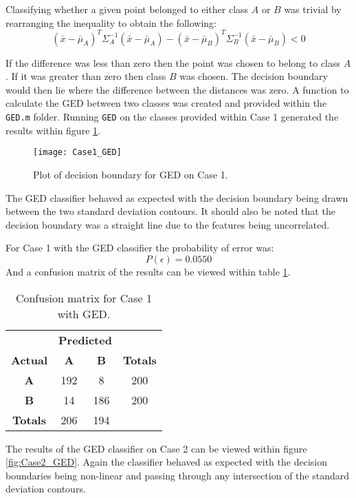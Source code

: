 \documentclass{article}
\begin{document}
Classifying whether a given point belonged to either class $A$ or $B$ was trivial by rearranging the inequality to obtain the following:
\[(\bar{x} - \bar{\mu}_{A})^{T}\Sigma^{-1}_{A}(\bar{x} - \bar{\mu}_{A}) -
    (\bar{x} - \bar{\mu}_{B})^{T}\Sigma^{-1}_{B}(\bar{x} - \bar{\mu}_{B}) < 0\]

 If the difference was less than zero then the point was chosen to belong to class $A$. If it was greater than zero then class $B$ was chosen. The decision boundary would then lie where the difference between the distances was zero. A function to calculate the GED between two classes was created and provided within the \verb|GED.m| folder. Running \verb|GED| on the classes provided within Case 1 generated the results within figure \ref{fig:Case1_GED}.

\begin{figure}[H]
    \caption{Plot of decision boundary for GED on Case 1.}
    \centering
    \texttt{[image: Case1\_GED]}
    \label{fig:Case1_GED}
\end{figure}

The GED classifier behaved as expected with the decision boundary being drawn between the two standard deviation contours. It should also be noted that the decision boundary was a straight line due to the features being uncorrelated.

For Case 1 with the GED classifier the probability of error was:
\[P(\epsilon) = 0.0550\]
And a confusion matrix of the results can be viewed within table \ref{tab:Case1_GED_error}.

\begin{table}[H]
    \centering
    \begin{tabular}{c|c c|c|}
        & \multicolumn{2}{c|}{\textbf{Predicted}} \\
        \textbf{Actual} & \textbf{A} & \textbf{B} & \textbf{Totals} \\
        \hline
        \textbf{A} & 192 \cellcolor[gray]{.8} & 8 & 200\\
        \textbf{B} & 14 & 186 \cellcolor[gray]{.8} & 200\\\hline
        \textbf{Totals} & 206 & 194\\
        \cline{1-3}
    \end{tabular}
    \caption{Confusion matrix for Case 1 with GED.}
    \label{tab:Case1_GED_error}
\end{table}

The results of the GED classifier on Case 2 can be viewed within figure \ref{fig:Case2_GED}. Again the classifier behaved as expected with the decision boundaries being non-linear and passing through any intersection of the standard deviation contours.
\end{document}
